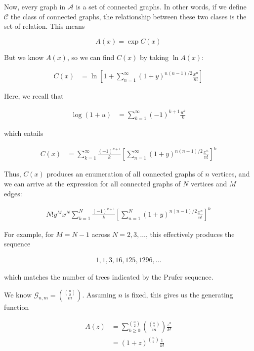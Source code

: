 \documentclass[a4paper, 12pt]{article}
\begin{document}
Now, every graph in $\mathcal{A}$ is a set of connected graphs. In other words,
if we define $\mathcal{C}$ the class of connected graphs, the relationship
between these two clases is the set-of relation. This means 

\begin{equation*}
    A(x) = \exp C(x)
\end{equation*}

But we know $A(x)$, so we can find $C(x)$ by taking $\ln A(x)$:

\begin{align*}
    C(x) &= \ln \left[1 + \sum_{n=1}^{\infty} (1+y)^{n(n-1)/2} \frac{x^n}{n!}\right]
\end{align*}

Here, we recall that 

\begin{align*}
    \log (1 + u) &= \sum_{k=1}^{\infty} (-1)^{k+1} \frac{u^k}{k}
\end{align*}

which entails 

\begin{align*}
    C(x) &= \sum_{k=1}^{\infty} \frac{ (-1)^{k+1} }{k} \left[ \sum_{n=1}^{\infty}\left( 1+y \right)^{n (n-1) / 2} \frac{x^n}{n!}  \right]^{k} 
\end{align*}

Thus, $C(x)$ produces an enumeration of all connected graphs of $n$ vertices, and we can arrive at the expression for all connected graphs of $N$ vertices and $M$ edges:

\begin{align*}
    N! y^M x^N \sum_{k=1}^{N} \frac{ (-1)^{k+1} }{k} \left[ \sum_{n=1}^{N}\left( 1+y \right)^{n (n-1) / 2} \frac{x^n}{n!}  \right]^{k} 
\end{align*}

For example, for $M = N - 1$ across $N = 2, 3, \ldots$, this effectively produces the sequence 

\begin{align*}
    1, 1, 3, 16, 125, 1296, \ldots
\end{align*}

which matches the number of trees indicated by the Prufer sequence.




\pagebreak 

We know $\mathcal{G}_{n, m} = \binom{\binom{n}{2}}{m}$. Assuming $n$ is fixed, this 
gives us the generating function

\begin{align*}
    A(z) &= \sum_{k\geq 0}^{\binom{n}{2}} \binom{\binom{n}{2}}{m}\frac{ z^k }{k!} \\ 
         &=\left(1+z\right)^{\binom{n}{2}}\frac{1}{k!}
\end{align*}
\end{document}
